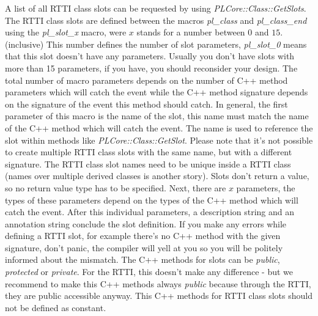 A list of all RTTI class slots can be requested by using \emph{PLCore::Class::GetSlots}. The RTTI class slots are defined between the macros \emph{pl\_class} and \emph{pl\_class\_end} using the \emph{pl\_slot\_x} macro, were $x$ stands for a number between $0$ and $15$. (inclusive) This number defines the number of slot parameters, \emph{pl\_slot\_0} means that this slot doesn't have any parameters. Usually you don't have slots with more than 15 parameters, if you have, you should reconsider your design. The total number of macro parameters depends on the number of C++ method parameters which will catch the event while the C++ method signature depends on the signature of the event this method should catch. In general, the first parameter of this macro is the name of the slot, this name must match the name of the C++ method which will catch the event. The name is used to reference the slot within methods like \emph{PLCore::Class::GetSlot}. Please note that it's not possible to create multiple RTTI class slots with the same name, but with a different signature. The RTTI class slot names need to be unique inside a RTTI class (names over multiple derived classes is another story). Slots don't return a value, so no return value type has to be specified. Next, there are $x$ parameters, the types of these parameters depend on the types of the C++ method which will catch the event. After this individual parameters, a description string and an annotation string conclude the slot definition. If you make any errors while defining a RTTI slot, for example there's no C++ method with the given signature, don't panic, the compiler will yell at you so you will be politely informed about the mismatch. The C++ methods for slots can be \emph{public}, \emph{protected} or \emph{private}. For the RTTI, this doesn't make any difference - but we recommend to make this C++ methods always \emph{public} because through the RTTI, they are public accessible anyway. This C++ methods for RTTI class slots should not be defined as constant.

